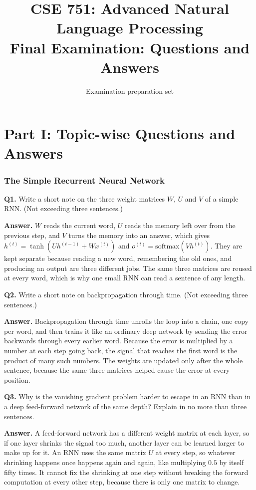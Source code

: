 \documentclass[11pt]{article}
\title{CSE 751: Advanced Natural Language Processing \\ Final Examination: Questions and Answers}
\author{Examination preparation set}
\date{}
\begin{document}
\maketitle

\tableofcontents

\newpage

\part*{Part I: Topic-wise Questions and Answers}

\section{The Simple Recurrent Neural Network}

\textbf{Q1.} Write a short note on the three weight matrices $W$, $U$ and $V$ of a simple
RNN. (Not exceeding three sentences.)

\textbf{Answer.} $W$ reads the current word, $U$ reads the memory left over from the previous
step, and $V$ turns the memory into an answer, which gives
$h^{(t)}=\tanh\!\left(Uh^{(t-1)}+Wx^{(t)}\right)$ and
$o^{(t)}=\mathrm{softmax}\!\left(Vh^{(t)}\right)$. They are kept separate because reading a
new word, remembering the old ones, and producing an output are three different jobs. The
same three matrices are reused at every word, which is why one small RNN can read a sentence
of any length.

\medskip
\textbf{Q2.} Write a short note on backpropagation through time. (Not exceeding three
sentences.)

\textbf{Answer.} Backpropagation through time unrolls the loop into a chain, one copy per
word, and then trains it like an ordinary deep network by sending the error backwards through
every earlier word. Because the error is multiplied by a number at each step going back, the
signal that reaches the first word is the product of many such numbers. The weights are
updated only after the whole sentence, because the same three matrices helped cause the error
at every position.

\medskip
\textbf{Q3.} Why is the vanishing gradient problem harder to escape in an RNN than in a deep
feed-forward network of the same depth? Explain in no more than three sentences.

\textbf{Answer.} A feed-forward network has a different weight matrix at each layer, so if
one layer shrinks the signal too much, another layer can be learned larger to make up for it.
An RNN uses the same matrix $U$ at every step, so whatever shrinking happens once happens
again and again, like multiplying $0.5$ by itself fifty times. It cannot fix the shrinking at
one step without breaking the forward computation at every other step, because there is only
one matrix to change.
\end{document}
